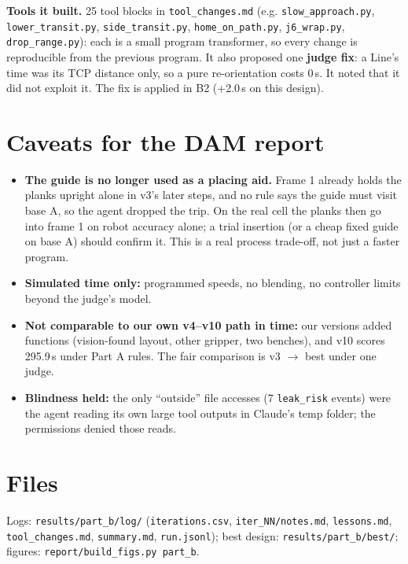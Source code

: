 \textbf{Tools it built.} 25 tool blocks in \texttt{tool\_changes.md} (e.g. \texttt{slow\_approach.py},
\texttt{lower\_transit.py}, \texttt{side\_transit.py}, \texttt{home\_on\_path.py}, \texttt{j6\_wrap.py},
\texttt{drop\_range.py}): each is a small program transformer, so every change is reproducible from the previous
program. It also proposed one \textbf{judge fix}: a Line's time was its TCP distance only, so a pure re-orientation
costs 0\,s. It noted that it did not exploit it. The fix is applied in B2 (+2.0\,s on this design).

\section{Caveats for the DAM report}
\begin{itemize}
\item \textbf{The guide is no longer used as a placing aid.} Frame 1 already holds the planks upright alone in v3's
  later steps, and no rule says the guide must visit base A, so the agent dropped the trip. On the real cell the
  planks then go into frame 1 on robot accuracy alone; a trial insertion (or a cheap fixed guide on base A) should
  confirm it. This is a real process trade-off, not just a faster program.
\item \textbf{Simulated time only:} programmed speeds, no blending, no controller limits beyond the judge's model.
\item \textbf{Not comparable to our own v4--v10 path in time:} our versions added functions (vision-found layout,
  other gripper, two benches), and v10 scores 295.9\,s under Part A rules. The fair comparison is v3 $\to$ best
  under one judge.
\item \textbf{Blindness held:} the only ``outside'' file accesses (7 \texttt{leak\_risk} events) were the agent
  reading its own large tool outputs in Claude's temp folder; the permissions denied those reads.
\end{itemize}

\section*{Files}
Logs: \texttt{results/part\_b/log/} (\texttt{iterations.csv}, \texttt{iter\_NN/notes.md}, \texttt{lessons.md},
\texttt{tool\_changes.md}, \texttt{summary.md}, \texttt{run.jsonl}); best design: \texttt{results/part\_b/best/};
figures: \texttt{report/build\_figs.py part\_b}.



